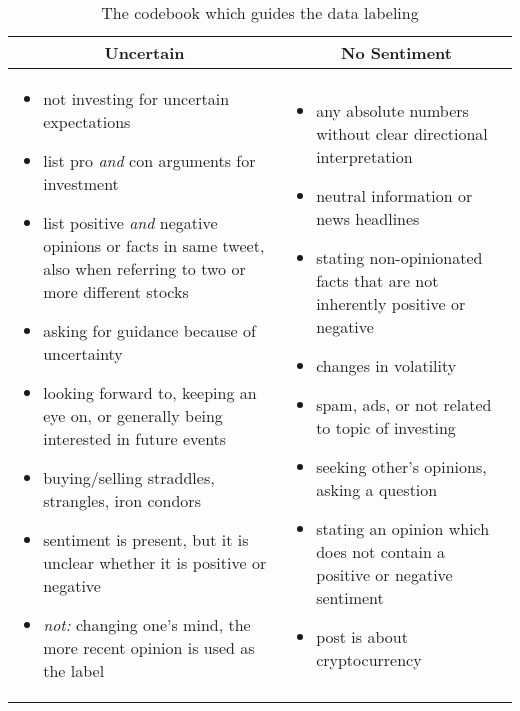 \begin{table}[!ht]
\begin{tabular}{p{7.5cm}p{7.5cm}}

\toprule
\multicolumn{1}{c}{\textbf{Uncertain}} & \multicolumn{1}{c}{\textbf{No Sentiment}} \\
\midrule
\begin{itemize}[noitemsep,leftmargin=*,topsep=-12pt]
	\item not investing for uncertain expectations
	\item list pro \emph{and} con arguments for investment
	\item list positive \emph{and} negative opinions or facts in same tweet, also when referring to two or more different stocks
	\item asking for guidance because of uncertainty
	\item looking forward to, keeping an eye on, or generally being interested in future events
	\item buying/selling straddles, strangles, iron condors
	\item sentiment is present, but it is unclear whether it is positive or negative
	\item \emph{not:} changing one's mind, the more recent opinion is used as the label

\end{itemize} & \begin{itemize}[noitemsep,leftmargin=*,topsep=-12pt]
	\item any absolute numbers without clear directional interpretation
	\item neutral information or news headlines
	\item stating non-opinionated facts that are not inherently positive or negative
	\item changes in volatility
	\item spam, ads, or not related to topic of investing
	\item seeking other's opinions, asking a question
	\item stating an opinion which does not contain a positive or negative sentiment
	\item post is about cryptocurrency
\end{itemize}\\

\bottomrule
\end{tabular}
\caption{The codebook which guides the data labeling}
\label{table-codebook}
\end{table}